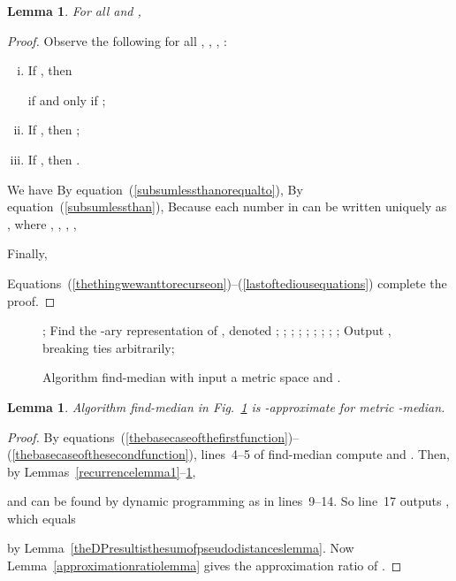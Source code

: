 \documentclass[letterpaper,12pt]{article}
\newtheorem{lemma}[theorem]{Lemma}
\newcommand{\comment}[1]{}
\begin{document}
\begin{lemma}
\label{recurrencelemma2}
For all  and ,

\end{lemma}
\begin{proof}
Observe
the following
for all
, , , :
\begin{enumerate}[(i)]
\item\label{item1}
If , then

if and only if
;
\item\label{item2}
If , then
;
\item\label{item3}
If , then
.
\end{enumerate}

\comment{ For convenience,

}
We have
{\footnotesize 
}
By equation~(\ref{subsumlessthanorequalto}),
{\small 
}By equation~(\ref{subsumlessthan}),
{\small 
}
Because each number in 
can be written
uniquely
as
,
where , , , ,

Finally,

Equations~(\ref{thethingwewanttorecurseon})--(\ref{lastoftediousequations})
complete the proof.
\end{proof}



\begin{figure}
\begin{algorithmic}[1]
\STATE ;
\STATE Find
the -ary representation
of , denoted
;
\FOR{}
  \STATE ;
  \STATE ;
\ENDFOR
{}
  \FOR{}
    \STATE ;
    \STATE ;
\STATE ;
    \STATE ;
    \STATE ;
    \STATE ;
  \ENDFOR
\ENDFOR
\STATE Output ,
breaking ties arbitrarily;
\end{algorithmic}
\caption{Algorithm {\sf find-median} with input
a
metric space  and .}
\label{mainalgorithm}
\end{figure}

\comment{ Lemmas~\ref{recurrencelemma1}--\ref{recurrencelemma2}
allow us to compute

by dynamic programming.
}
\begin{lemma}
\label{algorithmapproximationratiolemma}
Algorithm {\sf find-median} in Fig.~\ref{mainalgorithm}
is -approximate for {\sc metric -median}.
\end{lemma}
\begin{proof}
By
equations~(\ref{thebasecaseofthefirstfunction})--(\ref{thebasecaseofthesecondfunction}),
lines~4--5 of {\sf find-median}
compute 
and .
Then, by Lemmas~\ref{recurrencelemma1}--\ref{recurrencelemma2},

and 
can be found by dynamic programming as in lines~9--14.
So line~17 outputs
,
which equals

by Lemma~\ref{theDPresultisthesumofpseudodistanceslemma}.
Now Lemma~\ref{approximationratiolemma}
gives the approximation ratio of .
\end{proof}
\end{document}
